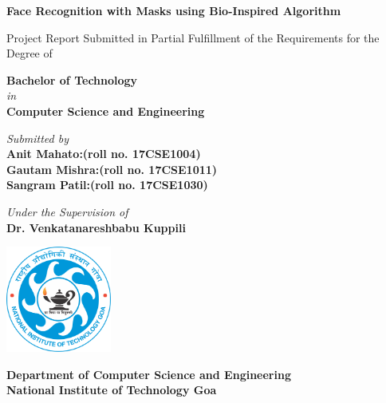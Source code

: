\documentclass[a4paper,12pt]{report}
\begin{document}
\begin{titlepage}
\begin{center}
       
       \Large {\textbf{Face Recognition with Masks using Bio-Inspired Algorithm}
}
        
     \vspace{0.2cm}
     {\footnotesize Project Report Submitted in Partial Fulfillment of the Requirements for the Degree of}\\
     \vspace{0.2cm}
   
    
     \textbf{\large Bachelor of Technology}\\
        {\textit{in}}\\
           \textbf{\Large Computer Science and Engineering}
           
           \vspace{0.5cm}
           
           \textit{Submitted by}\\
        \textbf{\large Anit Mahato:(roll no. 17CSE1004)}\\
         \textbf{\large Gautam Mishra:(roll no. 17CSE1011)}\\
          \textbf{\large Sangram Patil:(roll no. 17CSE1030)}
        \vspace{1cm}
                
        \centering \large {\textit{Under the Supervision of}}\\
        \textbf{\large Dr. Venkatanareshbabu Kuppili}\\
         \vspace{0.5cm}
     
      \includegraphics[width=0.26\textwidth]{images/NIT_Goa_Logo.png}\\
        \vspace{0.2cm}
        
       \textbf{Department of Computer Science and Engineering}\\
       \vspace{0.1cm}
        \textbf{National Institute of Technology Goa}\\
 
    \end{center} 
\end{titlepage}
\end{document}

